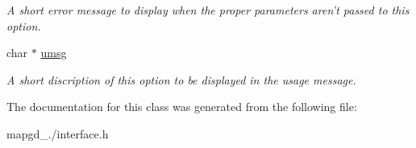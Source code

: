 \begin{DoxyCompactItemize}
\begin{DoxyCompactList}\small\item\em A short error message to display when the proper parameters aren't passed to this option. \end{DoxyCompactList}\item 
\hypertarget{classflag__t_a046af852179fa30fef1536f38d65aa77}{char $\ast$ \hyperlink{classflag__t_a046af852179fa30fef1536f38d65aa77}{umsg}}\label{classflag__t_a046af852179fa30fef1536f38d65aa77}

\begin{DoxyCompactList}\small\item\em A short discription of this option to be displayed in the usage message. \end{DoxyCompactList}\end{DoxyCompactItemize}


The documentation for this class was generated from the following file\-:\begin{DoxyCompactItemize}
\item 
mapgd\-\_./interface.\-h\end{DoxyCompactItemize}
